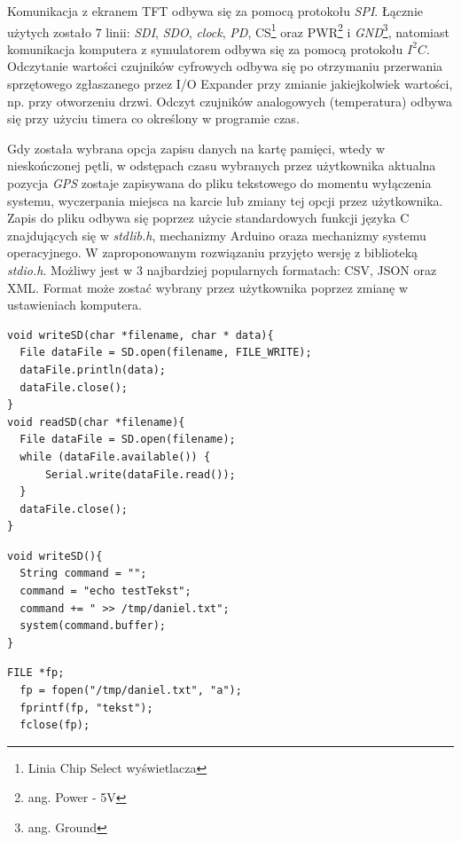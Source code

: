 \documentclass{xmgr}
\begin{document}
Komunikacja z ekranem TFT odbywa się za pomocą protokołu \emph{SPI}. Łącznie użytych zostało 7 linii: \emph{SDI}, \emph{SDO}, \emph{clock}, \emph{PD}, CS\footnote{Linia Chip Select wyświetlacza} oraz PWR\footnote{ang. Power - 5V} i \emph{GND}\footnote{ang. Ground}, natomiast komunikacja komputera z symulatorem odbywa się za pomocą protokołu $I^2C$. Odczytanie wartości czujników cyfrowych odbywa się po otrzymaniu przerwania sprzętowego zgłaszanego przez I/O Expander przy zmianie jakiejkolwiek wartości, np. przy otworzeniu drzwi. Odczyt czujników analogowych (temperatura) odbywa się przy użyciu timera co określony w programie czas.

Gdy została wybrana opcja zapisu danych na kartę pamięci, wtedy w nieskończonej pętli, w odstępach czasu wybranych przez użytkownika aktualna pozycja \emph{GPS} zostaje zapisywana do pliku tekstowego do momentu wyłączenia systemu, wyczerpania miejsca na karcie lub zmiany tej opcji przez użytkownika. Zapis do pliku odbywa się poprzez użycie standardowych funkcji języka C znajdujących się w \emph{stdlib.h}, mechanizmy Arduino oraza mechanizmy systemu operacyjnego. W zaproponowanym rozwiązaniu przyjęto wersję z biblioteką \emph{stdio.h}. Możliwy jest w 3 najbardziej popularnych formatach: CSV, JSON oraz XML. Format może zostać wybrany przez użytkownika poprzez zmianę w ustawieniach komputera.

\begin{lstlisting}[label=bot-dirs-alg,caption=Obsługa karty microSD za pomocą mechanizmu Arduino]
void writeSD(char *filename, char * data){
  File dataFile = SD.open(filename, FILE_WRITE);
  dataFile.println(data);
  dataFile.close();
}
void readSD(char *filename){
  File dataFile = SD.open(filename);
  while (dataFile.available()) {
      Serial.write(dataFile.read());
  }
  dataFile.close();
}
\end{lstlisting}

\begin{lstlisting}[label=bot-dirs-alg,caption=Obsługa karty microSD za pomocą mechanizmu systemu operacyjnego]
void writeSD(){
  String command = "";  
  command = "echo testTekst";
  command += " >> /tmp/daniel.txt";
  system(command.buffer);
}
\end{lstlisting}

\begin{lstlisting}[label=bot-dirs-alg,caption=Obsługa karty microSD za pomocą języka C]
  FILE *fp;
  fp = fopen("/tmp/daniel.txt", "a");
  fprintf(fp, "tekst");
  fclose(fp);
\end{lstlisting}
\end{document}
